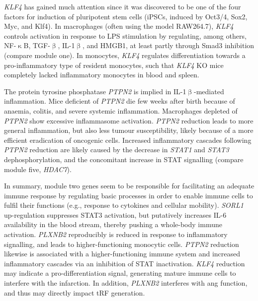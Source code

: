 \emph{KLF4} has gained much attention since it was discovered to be one of the four factors for induction of pluripotent stem cells (iPSCs, induced by Oct3/4, Sox2, Myc, and Klf4).\cite{Takahashi2006} In macrophages (often using the model RAW264.7), \emph{KLF4} controls activation in response to LPS stimulation by regulating, among others, NF-$\upkappa$B, TGF-$\upbeta$, IL-1$\upbeta$, and HMGB1, at least partly through Smad3 inhibition (compare module one).\cite{Feinberg2005,Liu2008,Liu2012} In monocytes, \emph{KLF4} regulates differentiation towards a pro-inflammatory type of resident monocytes, such that \emph{KLF4} KO mice completely lacked inflammatory monocytes in blood and spleen.\cite{Feinberg2007,Alder2008,Kurotaki2013}

The protein tyrosine phosphatase \emph{PTPN2} is implied in IL-1$\upbeta$-mediated inflammation. Mice deficient of \emph{PTPN2} die few weeks after birth because of anaemia, colitis, and severe systemic inflammation. Macrophages depleted of \emph{PTPN2} show excessive inflammasome activation. \emph{PTPN2} reduction leads to more general inflammation, but also less tumour susceptibility, likely because of a more efficient eradication of oncogenic cells.\cite{Spalinger2018} Increased inflammatory cascades following \emph{PTPN2} reduction are likely caused by the decrease in \emph{STAT1} and \emph{STAT3} dephosphorylation, and the concomitant increase in STAT signalling (compare module five, \emph{HDAC7}).\cite{Kim2018a}
 
In summary, module two genes seem to be responsible for facilitating an adequate immune response by regulating basic processes in order to enable immune cells to fulfil their functions (e.g., response to cytokines and cellular mobility). \emph{SORL1} up-regulation suppresses STAT3 activation, but putatively increases IL-6 availability in the blood stream, thereby pushing a whole-body immune activation. \emph{PLXNB2} reproducibly is reduced in response to inflammatory signalling, and leads to higher-functioning monocytic cells. \emph{PTPN2} reduction likewise is associated with a higher-functioning immune system and increased inflammatory cascades via an inhibition of STAT inactivation. \emph{KLF4} reduction may indicate a pro-differentiation signal, generating mature immune cells to interfere with the infarction. In addition, \emph{PLXNB2} interferes with \ac{ang} function, and thus may directly impact tRF generation. 


